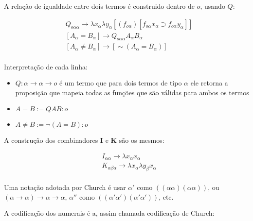 \documentclass[../main.tex]{subfiles}
\begin{document}
A relação de igualdade entre dois termos é construido dentro de $o$, usando $Q$:

\begin{align*}
    & Q_{o\alpha\alpha} \to \lambda x_{\alpha} \lambda y_{\alpha}[(f_{o\alpha})[f_{o\alpha}x_{\alpha} \supset f_{o\alpha}y_{\alpha}]] \\
    & [A_{\alpha} = B_{\alpha}] \to Q_{o\alpha\alpha}A_{\alpha}B_{\alpha} \\
    & [A_{\alpha} \neq  B_{\alpha}] \to [\sim(A_{\alpha} = B_{\alpha})] \\
\end{align*}

Interpretação de cada linha:

\begin{itemize}
    \item $Q : \alpha \to \alpha \to o$ é um termo que para dois termos de tipo $\alpha$ ele retorna a proposição que mapeia todas as funções que são válidas para ambos os termos
    \item $A = B := QAB : o$
    \item $A \neq B := \neg (A = B) : o$
\end{itemize}

A construção dos combinadores $\textbf{I}$ e $\textbf{K}$ são os mesmos:

\begin{align*}
    & I_{\alpha\alpha} \to \lambda x_{\alpha} x_{\alpha} \\
    & K_{\alpha\beta\alpha} \to \lambda x_{\alpha}\lambda y_{\beta} x_{\alpha} \\
\end{align*}

Uma notação adotada por Church é usar $\alpha'$ como $((\alpha\alpha)(\alpha\alpha))$, ou $(\alpha \to \alpha) \to \alpha \to \alpha$, $\alpha''$ como $((\alpha'\alpha')(\alpha'\alpha'))$, etc.

A codificação dos numerais é a, assim chamada codificação de Church:
\end{document}
